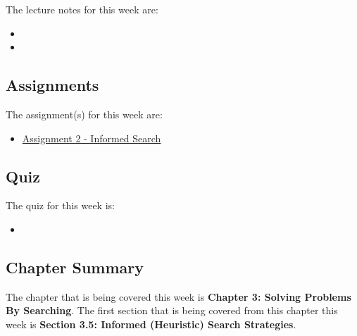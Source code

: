 \noindent The lecture notes for this week are:

\begin{itemize}
    \item {}
    \item {}
\end{itemize}

\subsection{Assignments}

The assignment(s) for this week are:

\begin{itemize}
    \item \href{https://github.com/QuantumCompiler/CU/tree/main/CSPB%203202%20-%20Introduction%20To%20Artificial%20Intelligence/Assignments/Assignment%202%20-%20Informed%20Search}{Assignment 2 - Informed Search}
\end{itemize}

\subsection{Quiz}

The quiz for this week is:

\begin{itemize}
    \item {}
\end{itemize}

\newpage

\subsection{Chapter Summary}

The chapter that is being covered this week is \textbf{Chapter 3: Solving Problems By Searching}. The first section that is being covered from this chapter this week is \textbf{Section 3.5: Informed (Heuristic) Search Strategies}.

